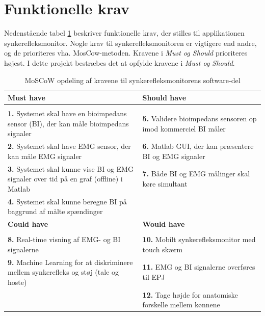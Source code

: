 \pagebreak
\section{Funktionelle krav}

Nedenstående tabel \ref{tab:moscow} beskriver funktionelle krav, der stilles til applikationen synkerefleksmonitor. Nogle krav til synkerefleksmonitoren er vigtigere end andre, og de prioriteres vha. MosCow-metoden. Kravene i\textit{ Must og Should} prioriteres højest. I dette projekt bestræbes det at opfylde kravene i \textit{ Must og Should}. 

\begin{table}[H]

\begin{tabularx}{\textwidth}{X|X}
\rowcolor{Gray}
\toprule
\textbf{Must have} & \textbf{Should have} \\
\hline \\
\textbf{1. }Systemet skal have en bioimpedans sensor (BI), der kan måle bioimpedans signaler & \textbf{5. }Validere bioimpedans sensoren op imod kommerciel BI måler \\[5ex]
\textbf{2. }Systemet skal have EMG sensor, der kan måle EMG signaler & \textbf{6. }Matlab GUI, der kan præsentere BI og EMG signaler \\[3ex]
\textbf{3. }Systemet skal kunne vise BI og EMG signaler over tid på en graf (offline) i Matlab  & \textbf{7. }Både BI og EMG målinger skal køre simultant\\[4ex]
\textbf{4. }Systemet skal kunne beregne BI på baggrund af målte spændinger & \\[4ex]


\midrule
    \rowcolor{Gray}
    \textbf{Could have} & \textbf{Would have}\\
    \midrule \\
\textbf{8. }Real-time visning af EMG- og BI signalerne & \textbf{10. }Mobilt synkerefleksmonitor med touch skærm\\[4ex]
\textbf{9. }Machine Learning for at diskriminere mellem synkerefleks og støj (tale og hoste)& \textbf{11. }EMG og BI signalerne overføres til EPJ  \\[4ex]
& \textbf{12. }Tage højde for anatomiske forskelle mellem kønnene\\[4ex]

\end{tabularx}

\caption{MoSCoW opdeling af kravene til  synkerefleksmonitorens software-del}
  \label{tab:moscow}
\end{table}





